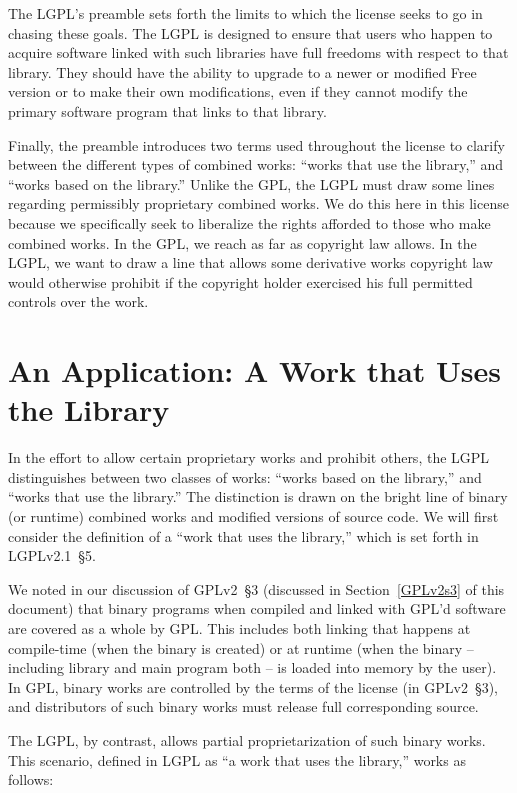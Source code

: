 The LGPL's preamble sets forth the limits to which the license seeks to go in
chasing these goals. The LGPL is designed to ensure that users who happen to
acquire software linked with such libraries have full freedoms with
respect to that library. They should have the ability to upgrade to a newer
or modified Free version or to make their own modifications, even if they
cannot modify the primary software program that links to that library.

Finally, the preamble introduces two terms used throughout the license to
clarify between the different types of combined works: ``works that use
the library,'' and ``works based on the library.''  Unlike the GPL, the LGPL must
draw some lines regarding permissibly proprietary combined works.  We do this here in this
license because we specifically seek to liberalize the rights afforded to
those who make combined works. In the GPL, we reach as far as copyright law
allows. In the LGPL, we want to draw a line that allows some derivative works
copyright law would otherwise prohibit if the copyright holder exercised
his full permitted controls over the work.

\section{An Application: A Work that Uses the Library}

In the effort to allow certain proprietary works and prohibit
others, the LGPL distinguishes between two classes of works:
``works based on the library,'' and ``works that use the library.''  The
distinction is drawn on the bright line of binary (or runtime) combined
works and modified versions of source code. We will first consider the definition
of a ``work that uses the library,'' which is set forth in LGPLv2.1~\S5.

We noted in our discussion of GPLv2~\S3 (discussed in
Section~\ref{GPLv2s3} of this document) that binary programs when
compiled and linked with GPL'd software are covered as a whole by GPL\@.
This includes both linking that happens at compile-time (when
the binary is created) or at runtime (when the binary -- including library
and main program both -- is loaded into memory by the user). In GPL,
binary works are controlled by the terms of the license (in GPLv2~\S3),
and distributors of such binary works must release full
corresponding source\@.

The LGPL, by contrast, allows partial proprietarization of such binary works.
This scenario, defined in LGPL as ``a work that uses the library,'' works as
follows:

